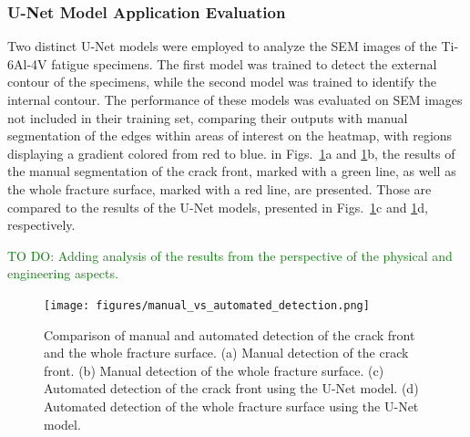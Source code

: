 \documentclass[preprint,12pt]{elsarticle}
\begin{document}
\begin{itemize}
\subsubsection{U-Net Model Application Evaluation}
Two distinct U-Net models were employed to analyze the SEM images of the Ti-6Al-4V fatigue specimens.
The first model was trained to detect the external contour of the specimens, while the second model was trained to identify the internal contour.
The performance of these models was evaluated on SEM images not included in their training set, comparing their outputs with manual segmentation of the edges within areas of interest on the heatmap, with regions displaying a gradient colored from red to blue.
in Figs.~\ref{fig:manual_vs_automated_detection}a and \ref{fig:manual_vs_automated_detection}b, the results of the manual segmentation of the crack front, marked with a green line, as well as the whole fracture surface, marked with a red line, are presented.
Those are compared to the results of the U-Net models, presented in Figs.~\ref{fig:manual_vs_automated_detection}c and \ref{fig:manual_vs_automated_detection}d, respectively.


\textcolor{green}{TO DO: Adding analysis of the results from the perspective of the physical and engineering aspects.}

\begin{figure}[ht!]
\centering
\texttt{[image: figures/manual\_vs\_automated\_detection.png]}
\caption{Comparison of manual and automated detection of the crack front and the whole fracture surface. (a) Manual detection of the crack front. (b) Manual detection of the whole fracture surface. (c) Automated detection of the crack front using the U-Net model. (d) Automated detection of the whole fracture surface using the U-Net model.}
\label{fig:manual_vs_automated_detection}
\end{figure}


\end{itemize}
\end{document}
